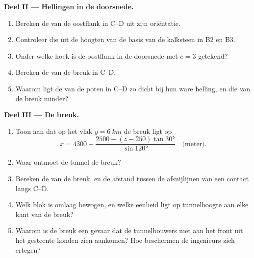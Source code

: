 \begin{problem}
\medskip
\noindent\textbf{Deel II --- Hellingen in de doorsnede.}
\begin{enumerate}[resume]
  \item Bereken de  van de oostflank in C--D uit zijn oriëntatie.
  \item Controleer die uit de hoogten van de basis van de kalksteen in B2 en B3.
  \item Onder welke hoek is de oostflank in de doorsnede met $e = 3$ getekend?
  \item Bereken de  van de breuk in C--D.
  \item Waarom ligt de  van de poten in C--D zo dicht bij hun ware helling, en die van de breuk minder?
\end{enumerate}

\medskip
\noindent\textbf{Deel III --- De breuk.}
\begin{enumerate}[resume]
  \item Toon aan dat op het vlak $y = \qty{6}{km}$ de breuk ligt op
        \[ x = 4300 + \frac{2500 - (z - 250)\tan\ang{30}}{\sin\ang{120}}
           \quad\text{(meter)}. \]
  \item Waar ontmoet de tunnel de breuk?
  \item Bereken de  van de breuk, en de afstand tussen de afsnijlijnen van een contact langs C--D.
  \item Welk blok is omlaag bewogen, en welke eenheid ligt op tunnelhoogte aan elke kant van de breuk?
  \item Waarom is de breuk een gevaar dat de tunnelbouwers niet aan het front uit het gesteente konden zien aankomen?
        Hoe beschermen de ingenieurs zich ertegen?
\end{enumerate}


\end{problem}
